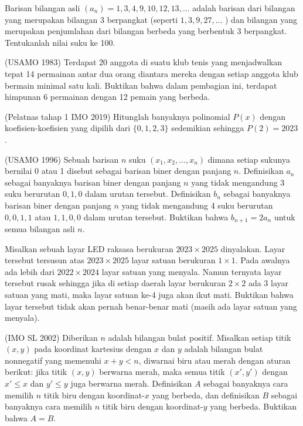 \documentclass[12pt]{scrartcl}
\begin{document}
\begin{soaljawab}
Barisan bilangan asli $(a_n) = 1,3,4,9,10,12,13,\dots$ adalah barisan dari bilangan yang merupakan bilangan 3 berpangkat (seperti $1,3,9,27,...$ ) dan bilangan yang merupakan penjumlahan dari bilangan berbeda yang berbentuk 3 berpangkat. Tentukanlah nilai suku ke 100.
\end{soaljawab}

\begin{soaljawab}
(USAMO 1983) Terdapat 20 anggota di suatu klub tenis yang menjadwalkan tepat 14 permainan antar dua orang diantara mereka dengan setiap anggota klub bermain minimal satu kali. Buktikan bahwa dalam pembagian ini, terdapat himpunan 6 permainan dengan 12 pemain yang berbeda.
\end{soaljawab}

\begin{soaljawab}
    (Pelatnas tahap 1 IMO 2019) Hitunglah banyaknya polinomial $P(x)$ dengan koefisien-koefisien yang dipilih dari $\{0, 1, 2, 3\}$ sedemikian sehingga $P(2) = 2023$.
\end{soaljawab}

\begin{soaljawab}
    (USAMO 1996) Sebuah barisan $n$ suku $(x_1,x_2,\dots,x_n)$ dimana setiap sukunya bernilai 0 atau 1 disebut sebagai barisan biner dengan panjang $n$. Definisikan $a_n$ sebagai banyaknya barisan biner dengan panjang $n$ yang tidak mengandung 3 suku berurutan $0,1,0$ dalam urutan tersebut. Definisikan $b_n$ sebagai banyaknya barisan biner dengan panjang $n$ yang tidak mengandung 4 suku berurutan $0,0,1,1$ atau $1,1,0,0$  dalam urutan tersebut. Buktikan bahwa $b_{n+1} = 2a_{n}$ untuk semua bilangan asli $n$.
\end{soaljawab}

\begin{soaljawab}
    Misalkan sebuah layar LED raksasa berukuran $2023 \times 2025$ dinyalakan. Layar tersebut tersusun atas $2023 \times 2025$ layar satuan berukuran $1 \times 1$. Pada awalnya ada lebih dari $2022 \times 2024$ layar satuan yang menyala. Namun ternyata layar tersebut rusak sehingga jika di setiap daerah layar berukuran $2 \times 2$ ada 3 layar satuan yang mati, maka layar satuan ke-4 juga akan ikut mati. Buktikan bahwa layar tersebut tidak akan pernah benar-benar mati (masih ada layar satuan yang menyala).
\end{soaljawab}

\begin{soaljawab}
    (IMO SL 2002) Diberikan $n$ adalah bilangan bulat positif. Misalkan setiap titik $(x,y)$ pada koordinat kartesius dengan $x$ dan $y$ adalah bilangan bulat nonnegatif yang memenuhi $x+y < n$, diwarnai biru atau merah dengan aturan berikut: jika titik $(x,y)$ berwarna merah, maka semua titik $(x',y')$ dengan $x' \le x$ dan $y' \le y$ juga berwarna merah. Definisikan $A$ sebagai banyaknya cara memilih $n$ titik biru dengan koordinat-$x$ yang berbeda, dan definisikan $B$ sebagai banyaknya cara memilih $n$ titik biru dengan koordinat-$y$ yang berbeda. Buktikan bahwa $A=B$.
\end{soaljawab}
\end{document}
